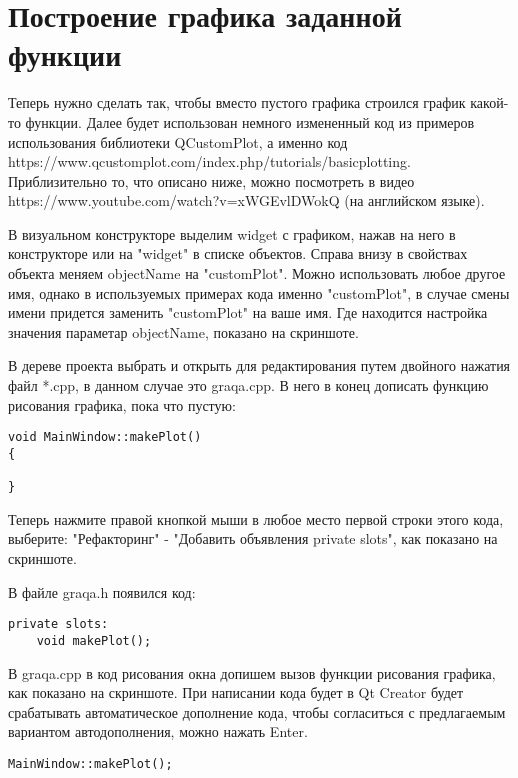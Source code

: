 \section{Построение графика заданной функции}

Теперь нужно сделать так, чтобы вместо пустого графика строился график какой-то функции. Далее будет использован немного измененный код из примеров использования библиотеки QCustomPlot, а именно код https://www.qcustomplot.com/index.php/tutorials/basicplotting. Приблизительно то, что описано ниже, можно посмотреть в видео https://www.youtube.com/watch?v=xWGEvlDWokQ (на английском языке).

В визуальном конструкторе выделим widget с графиком, нажав на него в конструкторе или на "widget" в списке объектов. Справа внизу в свойствах объекта меняем objectName на "customPlot". Можно использовать любое другое имя, однако в используемых примерах кода именно "customPlot", в случае смены имени придется заменить "customPlot" на ваше имя. Где находится настройка значения параметар objectName, показано на скриншоте.

В дереве проекта выбрать и открыть для редактирования путем двойного нажатия файл *.cpp, в данном случае это graqa.cpp. В него в конец дописать функцию рисования графика, пока что пустую:
\begin{verbatim}
void MainWindow::makePlot()
{

}
\end{verbatim}

Теперь нажмите правой кнопкой мыши в любое место первой строки этого кода, выберите: "Рефакторинг" - "Добавить объявления private slots", как показано на скриншоте.

В файле graqa.h появился код:
\begin{verbatim}
private slots:
    void makePlot();
\end{verbatim}

В graqa.cpp в код рисования окна допишем вызов функции рисования графика, как показано на скриншоте. При написании кода будет в Qt Creator будет срабатывать автоматическое дополнение кода, чтобы согласиться с предлагаемым вариантом автодополнения, можно нажать Enter.
\begin{verbatim}
MainWindow::makePlot();
\end{verbatim}

